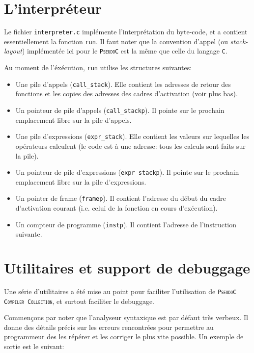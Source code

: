 \documentclass[12pt,a4paper,openright]{report}
\newcommand{\nom}[1]{\textsc{\texttt{#1}}}
\newcommand{\pc}{\nom{PseudoC}}
\newcommand{\pcc}{\nom{PseudoC Compiler Collection}}
\newcommand{\ce}{\nom{C}}
\begin{document}
\chapter{L'interpréteur}
    Le fichier \texttt{interpreter.c} implémente l'interprétation du
    byte-code, et a contient essentiellement la fonction \texttt{run}.
    Il faut noter que la convention d'appel (ou \emph{stack-layout}) implémentée
    ici pour le \pc{} est la même que celle du langage \ce.

    Au moment de l'éxécution, \texttt{run} utilise les structures
    suivantes:

    \begin{itemize}
        \item Une pile d'appels (\texttt{call\_stack}). Elle contient
        les adresses de retour des fonctions et les copies des adresses
        des cadres d'activation (voir plus bas).
        \item Un pointeur de pile d'appels (\texttt{call\_stackp}). Il
        pointe sur le prochain emplacement libre sur la pile d'appels.
        \item Une pile d'expressions (\texttt{expr\_stack}). Elle
        contient les valeurs sur lequelles les opérateurs calculent
        (le code est à une adresse: tous les calculs sont faits sur la
        pile).
        \item Un pointeur de pile d'expressions (\texttt{expr\_stackp}).
        Il pointe sur le prochain emplacement libre sur la pile
        d'expressions.
        \item Un pointer de frame (\texttt{framep}). Il contient
        l'adresse du début du cadre d'activation courant (i.e. celui de la
        fonction en cours d'exécution).
        \item Un compteur de programme (\texttt{instp}). Il contient
        l'adresse de l'instruction suivante.
    \end{itemize}

\chapter{Utilitaires et support de debuggage}
    Une série d'utilitaires a été mise au point pour faciliter
    l'utilisation de \pcc, et surtout faciliter le debuggage.

    Commençons par noter que l'analyseur syntaxique est par défaut très
    verbeux. Il donne des détails précis sur les erreurs rencontrées
    pour permettre au programmeur des les répérer et les corriger le
    plus vite possible. Un exemple de sortie est le suivant:
\end{document}
